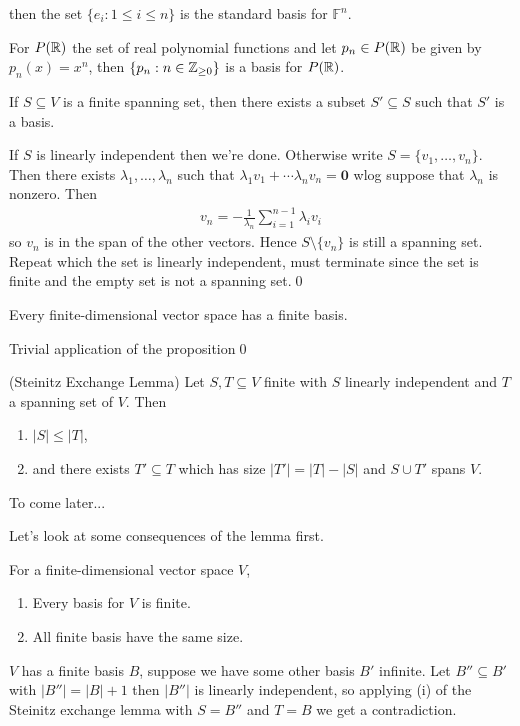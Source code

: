 \documentclass{article}
\newcommand{\F}{\mathbb{F}}
\begin{document}
then the set $ \{e_i:1\le i\le n\} $ is the standard basis for $ \F^n $.\par
For $ P(\mathbb{R}) $ the set of real polynomial functions and let $ p_n\in P(\mathbb{R}) $ be given by $ p_n(x)=x^n $, then $ \{p_n:n\in\mathbb{Z}_{\ge 0}\} $ is a basis for $ P(\mathbb{R}) $.
\begin{proposition}
  If $ S\subseteq V $ is a finite spanning set, then there exists a subset $ S'\subseteq S $ such that $ S' $ is a basis.
\end{proposition}
\pf If $ S $ is linearly independent then we're done. Otherwise write $ S=\{v_1,\dots, v_n\} $. Then there exists $ \lambda_1,\dots, \lambda_n $ such that $ \lambda_1v_1+\cdots\lambda_nv_n=\mathbf 0 $ wlog suppose that $ \lambda_n $ is nonzero. Then
\begin{align*}
	v_n=-\frac 1{\lambda_n}\sum_{i=1}^{n-1}\lambda_iv_i
\end{align*}
so $ v_n $ is in the span of the other vectors. Hence $ S\setminus \{v_n\} $ is still a spanning set. Repeat which the set is linearly independent, must terminate since the set is finite and the empty set is not a spanning set.\qed
\begin{corollary}
  Every finite-dimensional vector space has a finite basis.
\end{corollary}
\pf Trivial application of the proposition\qed
\begin{theorem}
	(Steinitz Exchange Lemma) Let $ S,T\subseteq V $ finite with $ S $ linearly independent and $ T $ a spanning set of $ V $. Then
	\begin{enumerate}
		\item $ |S|\le |T| $,
		\item and there exists $ T'\subseteq T $ which has size $ |T'|=|T|-|S| $ and $ S\cup T' $ spans $ V $.
	\end{enumerate}
\end{theorem}
\pf To come later...\par
Let's look at some consequences of the lemma first.
\begin{corollary}
	For a finite-dimensional vector space $ V $,
  \begin{enumerate}
	  \item Every basis for $ V $ is finite.
	  \item All finite basis have the same size.
  \end{enumerate}
\end{corollary}
\pf $ V $ has a finite basis $ B $, suppose we have some other basis $ B' $ infinite. Let $ B''\subseteq B' $ with $ |B''|=|B|+1 $ then $ |B''| $ is linearly independent, so applying (i) of the Steinitz exchange lemma with $ S=B'' $ and $ T=B $ we get a contradiction.\par
\end{document}
